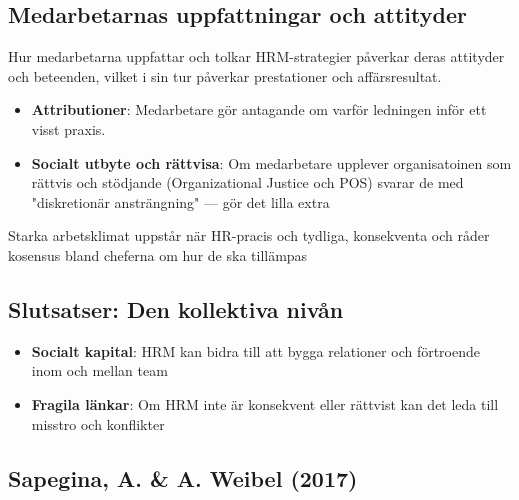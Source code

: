 \documentclass[12pt,a4paper]{article}
\begin{document}
\subsection{Medarbetarnas uppfattningar och attityder}
Hur medarbetarna uppfattar och tolkar HRM-strategier påverkar deras attityder och beteenden, vilket i sin tur påverkar prestationer och affärsresultat.
\begin{itemize}
    \item \textbf{Attributioner}: Medarbetare gör antagande om varför ledningen inför ett visst praxis.
    \item \textbf{Socialt utbyte och rättvisa}: Om medarbetare upplever organisatoinen som rättvis och stödjande (Organizational Justice och POS) svarar de med "diskretionär ansträngning" --- gör det lilla extra
\end{itemize}
Starka arbetsklimat uppstår när HR-pracis och tydliga, konsekventa och råder kosensus bland cheferna om hur de ska tillämpas

\subsection{Slutsatser: Den kollektiva nivån}
\begin{itemize}
    \item \textbf{Socialt kapital}: HRM kan bidra till att bygga relationer och förtroende inom och mellan team
    \item \textbf{Fragila länkar}: Om HRM inte är konsekvent eller rättvist kan det leda till misstro och konflikter
\end{itemize}

\subsection{Sapegina, A. \& A. Weibel (2017)}
\end{document}
